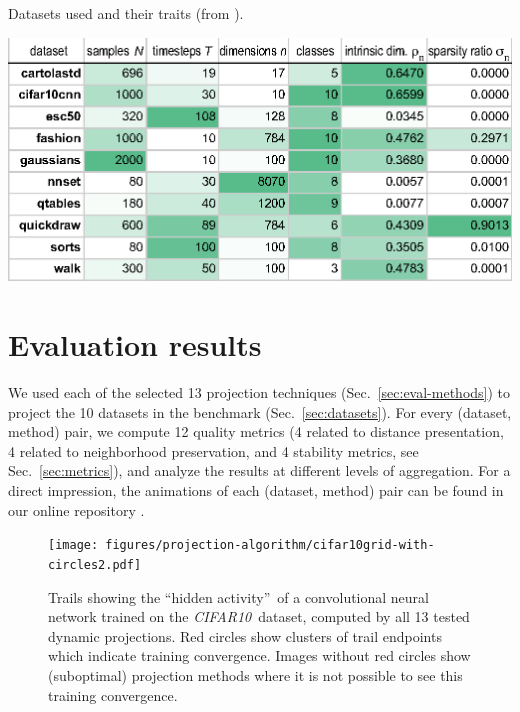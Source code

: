 \begin{table}
\centering
\caption{Datasets used and their traits (from \cite{Vernier2020}).}
\label{tab:datasets}
\includegraphics[width=\linewidth]{figures/projection-algorithm/datasets.eps}
\end{table}
  
\section{Evaluation results}
\label{sec:results}
%
We used each of the selected 13 projection techniques (Sec.~\ref{sec:eval-methods}) to project the 10 datasets in the benchmark (Sec.~\ref{sec:datasets}). For every (dataset, method) pair, we compute 12 quality metrics (4 related to distance presentation, 4 related to neighborhood preservation, and 4 stability metrics, see Sec.~\ref{sec:metrics}), and analyze the results at different levels of aggregation.
For a direct impression, the animations of each (dataset, method) pair can be found in our online repository \citep{repo-guided}.


\begin{figure}[htb!]
  \centering
  \texttt{[image: figures/projection-algorithm/cifar10grid-with-circles2.pdf]}
  \caption{Trails showing the ``hidden activity''\,\citep{Rauber2017} of a convolutional neural network trained on the \emph{CIFAR10}\,\citep{dataset:cifar10} dataset, computed by all 13 tested dynamic projections. Red circles show clusters of trail endpoints which indicate training convergence. Images without red circles show (suboptimal) projection methods where it is not possible to see this training convergence.}  
  \label{fig:cifar}
  \vspace{-0.5cm}
\end{figure}



